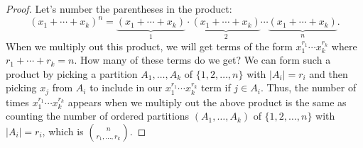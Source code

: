 \documentclass[11pt,dvipsnames]{book}
\numberwithin{equation}{section} %
\numberwithin{figure}{section} %
\numberwithin{table}{section} %
\begin{document}
\begin{proof}


Let's number the parentheses in the product:
\[
(x_{1}+\cdots + x_{k})^{n} = \underbrace{(x_{1}+\cdots + x_{k})}_{1}\cdot \underbrace{(x_{1}+\cdots + x_{k})}_{2}\cdots \underbrace{(x_{1}+\cdots + x_{k})}_{n}.
\]
When we multiply out this product, we will get terms of the form $x_{1}^{r_{1}}\cdots x_{k}^{r_{k}}$ where $r_{1}+\cdots + r_{k}=n$. How many of these terms do we get? We can form such a product by picking a partition $A_{1}, \dots ,A_{k}$ of $\{1,2, \dots ,n\}$ with $|A_i|=r_i$ and then picking $x_j$ from $A_i$ to include in our $x_{1}^{r_{1}}\cdots x_{k}^{r_{k}}$ term if $j\in A_i$. Thus, the number of times $x_{1}^{r_{1}}\cdots x_{k}^{r_{k}}$ appears when we multiply out the above product is the same as counting the number of ordered partitions $(A_{1}, \dots ,A_{k})$ of $\{1,2, \dots ,n\}$ with $|A_i|=r_i$, which is  ${n\choose r_{1}, \dots ,r_{k}} $. 

%
\end{proof}
\end{document}
